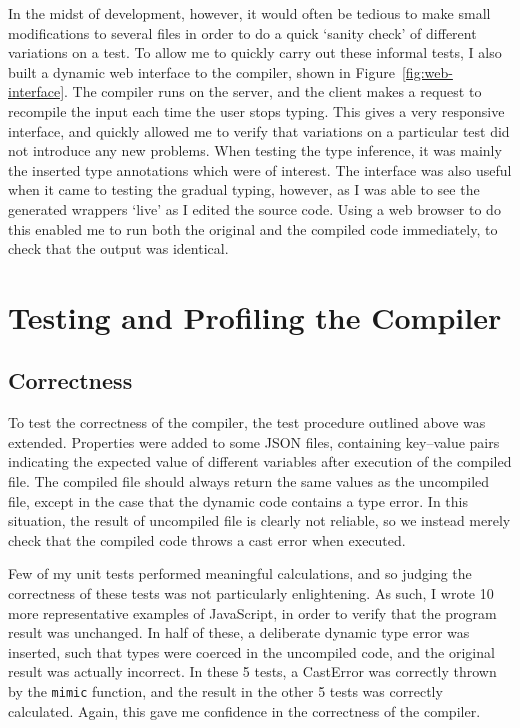 \documentclass[12pt,a4paper,twoside,openright]{report}
\theoremstyle{definition}
\theoremstyle{dotless}
\begin{document}
In the midst of development, however, it would often be tedious to make small
modifications to several files in order to do a quick `sanity check' of
different variations on a test. To allow me to quickly carry out these informal
tests, I also built a dynamic web interface to the compiler, shown in
Figure~\ref{fig:web-interface}.  The compiler runs on the server, and the
client makes a request to recompile the input each time the user stops typing.
This gives a very responsive interface, and quickly allowed me to verify that
variations on a particular test did not introduce any new problems. When
testing the type inference, it was mainly the inserted type annotations which
were of interest. The interface was also useful when it came to testing the
gradual typing, however, as I was able to see the generated wrappers `live' as
I edited the source code. Using a web browser to do this enabled me to run both
the original and the compiled code immediately, to check that the output was
identical.

\section{Testing and Profiling the Compiler}

\subsection*{Correctness}

To test the correctness of the compiler, the test procedure outlined above was
extended. Properties were added to some JSON files, containing
key--value pairs indicating the expected value of different variables after
execution of the compiled file. The compiled file should always return the same
values as the uncompiled file, except in the case that the dynamic code
contains a type error. In this situation, the result of
uncompiled file is clearly not reliable, so we instead merely check that the
compiled code throws a cast error when executed.

Few of my unit tests performed meaningful calculations, and so judging the
correctness of these tests was not particularly enlightening. As such, I wrote
10 more representative examples of JavaScript, in order to verify that the
program result was unchanged. In half of these, a deliberate dynamic type error
was inserted, such that types were coerced in the uncompiled code, and the
original result was actually incorrect. In these 5 tests, a CastError was
correctly thrown by the \texttt{mimic} function, and the result in the other 5
tests was correctly calculated. Again, this gave me confidence in the correctness
of the compiler.
\end{document}
